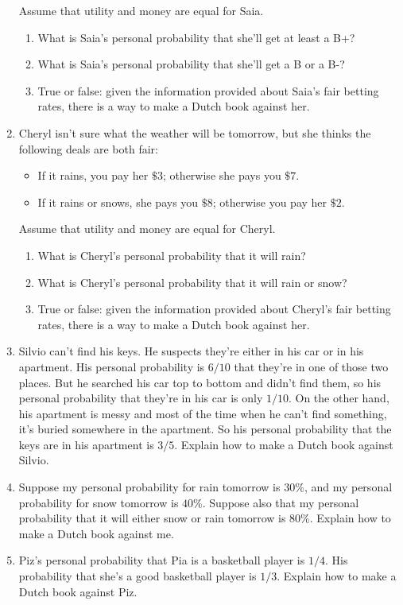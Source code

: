 \documentclass[justified]{tufte-book}
\providecommand{\tightlist}{%
  \setlength{\itemsep}{0pt}\setlength{\parskip}{0pt}}
\theoremstyle{definition}
\theoremstyle{definition}
\theoremstyle{definition}
\theoremstyle{remark}
\begin{document}
\begin{enumerate}
  Assume that utility and money are equal for Saia.

  \begin{enumerate}
  \def\labelenumii{\alph{enumii}.}
  \tightlist
  \item
    What is Saia's personal probability that she'll get at least a B+?
  \item
    What is Saia's personal probability that she'll get a B or a B-?
  \item
    True or false: given the information provided about Saia's fair
    betting rates, there is a way to make a Dutch book against her.
  \end{enumerate}
\item
  Cheryl isn't sure what the weather will be tomorrow, but she thinks
  the following deals are both fair:

  \begin{itemize}
  \tightlist
  \item
    If it rains, you pay her \(\$3\); otherwise she pays you \(\$7\).
  \item
    If it rains or snows, she pays you \(\$8\); otherwise you pay her
    \(\$2\).
  \end{itemize}

  Assume that utility and money are equal for Cheryl.

  \begin{enumerate}
  \def\labelenumii{\alph{enumii}.}
  \tightlist
  \item
    What is Cheryl's personal probability that it will rain?
  \item
    What is Cheryl's personal probability that it will rain or snow?
  \item
    True or false: given the information provided about Cheryl's fair
    betting rates, there is a way to make a Dutch book against her.
  \end{enumerate}
\item
  Silvio can't find his keys. He suspects they're either in his car or
  in his apartment. His personal probability is \(6/10\) that they're in
  one of those two places. But he searched his car top to bottom and
  didn't find them, so his personal probability that they're in his car
  is only \(1/10\). On the other hand, his apartment is messy and most
  of the time when he can't find something, it's buried somewhere in the
  apartment. So his personal probability that the keys are in his
  apartment is \(3/5\). Explain how to make a Dutch book against Silvio.
\item
  Suppose my personal probability for rain tomorrow is \(30\%\), and my
  personal probability for snow tomorrow is \(40\%\). Suppose also that
  my personal probability that it will either snow or rain tomorrow is
  \(80\%\). Explain how to make a Dutch book against me.
\item
  Piz's personal probability that Pia is a basketball player is \(1/4\).
  His probability that she's a good basketball player is \(1/3\).
  Explain how to make a Dutch book against Piz.
\end{enumerate}
\end{document}
